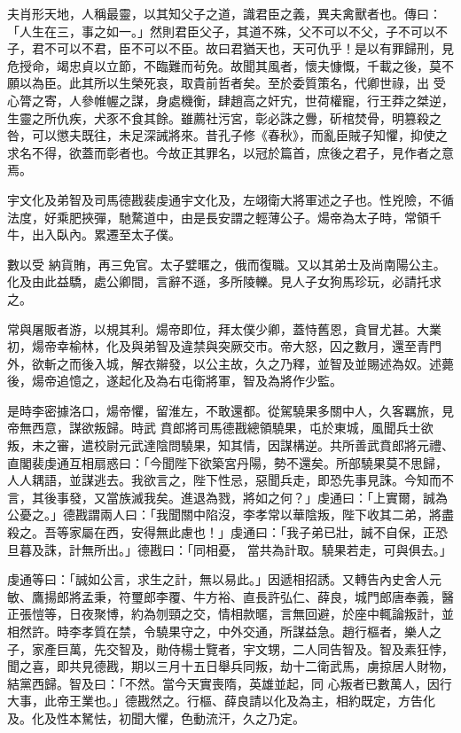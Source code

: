 
\begin{pinyinscope}

 夫肖形天地，人稱最靈，以其知父子之道，識君臣之義，異夫禽獸者也。傳曰：「人生在三，事之如一。」然則君臣父子，其道不殊，父不可以不父，子不可以不子，君不可以不君，臣不可以不臣。故曰君猶天也，天可仇乎！是以有罪歸刑，見危授命，竭忠貞以立節，不臨難而茍免。故聞其風者，懷夫慷慨，千載之後，莫不願以為臣。此其所以生榮死哀，取貴前哲者矣。至於委質策名，代卿世祿，出
 受心膂之寄，人參帷幄之謀，身處機衡，肆趙高之奸宄，世荷權寵，行王莽之桀逆，生靈之所仇疾，犬豕不食其餘。雖薦社污宮，彰必誅之釁，斫棺焚骨，明篡殺之咎，可以懲夫既往，未足深誡將來。昔孔子修《春秋》，而亂臣賊子知懼，抑使之求名不得，欲蓋而彰者也。今故正其罪名，以冠於篇首，庶後之君子，見作者之意焉。



 宇文化及弟智及司馬德戡裴虔通宇文化及，左翊衛大將軍述之子也。性兇險，不循法度，好乘肥挾彈，馳騖道中，由是長安謂之輕薄公子。煬帝為太子時，常領千牛，出入臥內。累遷至太子僕。



 數以受
 納貨賄，再三免官。太子嬖暱之，俄而復職。又以其弟士及尚南陽公主。化及由此益驕，處公卿間，言辭不遜，多所陵轢。見人子女狗馬珍玩，必請托求之。



 常與屠販者游，以規其利。煬帝即位，拜太僕少卿，蓋恃舊恩，貪冒尤甚。大業初，煬帝幸榆林，化及與弟智及違禁與突厥交市。帝大怒，囚之數月，還至青門外，欲斬之而後入城，解衣辮發，以公主故，久之乃釋，並智及並賜述為奴。述薨後，煬帝追憶之，遂起化及為右屯衛將軍，智及為將作少監。



 是時李密據洛口，煬帝懼，留淮左，不敢還都。從駕驍果多關中人，久客羈旅，見帝無西意，謀欲叛歸。時武
 賁郎將司馬德戡總領驍果，屯於東城，風聞兵士欲叛，未之審，遣校尉元武達陰問驍果，知其情，因謀構逆。共所善武賁郎將元禮、直閣裴虔通互相扇惑曰：「今聞陛下欲築宮丹陽，勢不還矣。所部驍果莫不思歸，人人耦語，並謀逃去。我欲言之，陛下性忌，惡聞兵走，即恐先事見誅。今知而不言，其後事發，又當族滅我矣。進退為戮，將如之何？」虔通曰：「上實爾，誠為公憂之。」德戡謂兩人曰：「我聞關中陷沒，李孝常以華陰叛，陛下收其二弟，將盡殺之。吾等家屬在西，安得無此慮也！」虔通曰：「我子弟已壯，誠不自保，正恐旦暮及誅，計無所出。」德戡曰：「同相憂，
 當共為計取。驍果若走，可與俱去。」



 虔通等曰：「誠如公言，求生之計，無以易此。」因遞相招誘。又轉告內史舍人元敏、鷹揚郎將孟秉，符璽郎李覆、牛方裕、直長許弘仁、薛良，城門郎唐奉義，醫正張愷等，日夜聚博，約為刎頸之交，情相款暱，言無回避，於座中輒論叛計，並相然許。時李孝質在禁，令驍果守之，中外交通，所謀益急。趙行樞者，樂人之子，家產巨萬，先交智及，勛侍楊士覽者，宇文甥，二人同告智及。智及素狂悖，聞之喜，即共見德戡，期以三月十五日舉兵同叛，劫十二衛武馬，虜掠居人財物，結黨西歸。智及曰：「不然。當今天實喪隋，英雄並起，同
 心叛者已數萬人，因行大事，此帝王業也。」德戡然之。行樞、薛良請以化及為主，相約既定，方告化及。化及性本駑怯，初聞大懼，色動流汗，久之乃定。




\end{pinyinscope}
